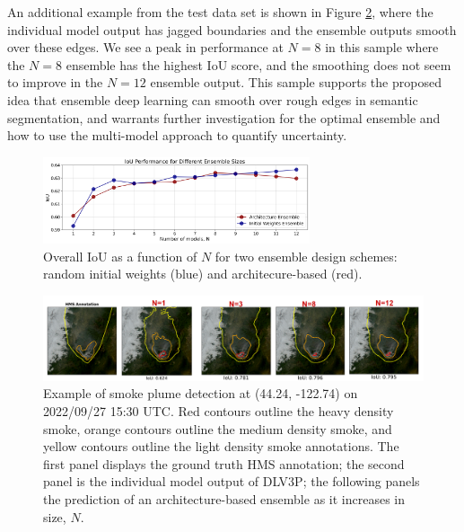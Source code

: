 \documentclass{article}
\begin{document}
An additional example from the test data set is shown in Figure \ref{fig:smoothing_ex}, where the individual model output has jagged boundaries and the ensemble outputs smooth over these edges. We see a peak in performance at $N=8$ in this sample where the $N=8$ ensemble has the highest IoU score, and the smoothing does not seem to improve in the $N=12$ ensemble output. This sample supports the proposed idea that ensemble deep learning can smooth over rough edges in semantic segmentation, and warrants further investigation for the optimal ensemble and how to use the multi-model approach to quantify uncertainty. 
\begin{figure}
    \centering
    \includegraphics[width=0.70\textwidth]{ensemble_size_plot.png}
    \caption{\RaggedRight Overall IoU as a function of $N$ for two ensemble design schemes: random initial weights (blue) and architecure-based (red).}
    \label{fig:ensemble_size_plot}
\end{figure}

\begin{figure}[h]
    \centering
    \includegraphics[width=\textwidth]{smoothing_ex.png}
    \caption{Example of smoke plume detection at (44.24, -122.74) on 2022/09/27 15:30 UTC. Red contours outline the heavy density smoke, orange contours outline the medium density smoke, and yellow contours outline the light density smoke annotations. The first panel displays the ground truth HMS annotation; the second panel is the individual model output of DLV3P; the following panels the prediction of an architecture-based ensemble as it increases in size, $N$.}
    \label{fig:smoothing_ex}
\end{figure}


\end{document}
